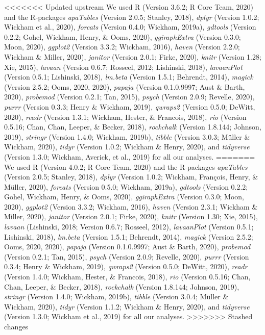 \documentclass[
  english,
  man,floatsintext]{apa6}
\begin{document}
<<<<<<< Updated upstream
We used R (Version 3.6.2; R Core Team, 2020) and the R-packages \emph{apaTables} (Version 2.0.5; Stanley, 2018), \emph{dplyr} (Version 1.0.2; Wickham et al., 2020), \emph{forcats} (Version 0.4.0; Wickham, 2019a), \emph{gdtools} (Version 0.2.2; Gohel, Wickham, Henry, \& Ooms, 2020), \emph{ggiraphExtra} (Version 0.3.0; Moon, 2020), \emph{ggplot2} (Version 3.3.2; Wickham, 2016), \emph{haven} (Version 2.2.0; Wickham \& Miller, 2020), \emph{janitor} (Version 2.0.1; Firke, 2020), \emph{knitr} (Version 1.28; Xie, 2015), \emph{lavaan} (Version 0.6.7; Rosseel, 2012; Lishinski, 2018), \emph{lavaanPlot} (Version 0.5.1; Lishinski, 2018), \emph{lm.beta} (Version 1.5.1; Behrendt, 2014), \emph{magick} (Version 2.5.2; Ooms, 2020, 2020), \emph{papaja} (Version 0.1.0.9997; Aust \& Barth, 2020), \emph{probemod} (Version 0.2.1; Tan, 2015), \emph{psych} (Version 2.0.9; Revelle, 2020), \emph{purrr} (Version 0.3.3; Henry \& Wickham, 2019), \emph{qwraps2} (Version 0.5.0; DeWitt, 2020), \emph{readr} (Version 1.3.1; Wickham, Hester, \& Francois, 2018), \emph{rio} (Version 0.5.16; Chan, Chan, Leeper, \& Becker, 2018), \emph{rockchalk} (Version 1.8.144; Johnson, 2019), \emph{stringr} (Version 1.4.0; Wickham, 2019b), \emph{tibble} (Version 3.0.3; Müller \& Wickham, 2020), \emph{tidyr} (Version 1.0.2; Wickham \& Henry, 2020), and \emph{tidyverse} (Version 1.3.0; Wickham, Averick, et al., 2019) for all our analyses.
=======
We used R (Version 4.0.2; R Core Team, 2020) and the R-packages \emph{apaTables} (Version 2.0.5; Stanley, 2018), \emph{dplyr} (Version 1.0.2; Wickham, François, Henry, \& Müller, 2020), \emph{forcats} (Version 0.5.0; Wickham, 2019a), \emph{gdtools} (Version 0.2.2; Gohel, Wickham, Henry, \& Ooms, 2020), \emph{ggiraphExtra} (Version 0.3.0; Moon, 2020), \emph{ggplot2} (Version 3.3.2; Wickham, 2016), \emph{haven} (Version 2.3.1; Wickham \& Miller, 2020), \emph{janitor} (Version 2.0.1; Firke, 2020), \emph{knitr} (Version 1.30; Xie, 2015), \emph{lavaan} (Lishinski, 2018; Version 0.6.7; Rosseel, 2012), \emph{lavaanPlot} (Version 0.5.1; Lishinski, 2018), \emph{lm.beta} (Version 1.5.1; Behrendt, 2014), \emph{magick} (Version 2.5.2; Ooms, 2020, 2020), \emph{papaja} (Version 0.1.0.9997; Aust \& Barth, 2020), \emph{probemod} (Version 0.2.1; Tan, 2015), \emph{psych} (Version 2.0.9; Revelle, 2020), \emph{purrr} (Version 0.3.4; Henry \& Wickham, 2019), \emph{qwraps2} (Version 0.5.0; DeWitt, 2020), \emph{readr} (Version 1.4.0; Wickham, Hester, \& Francois, 2018), \emph{rio} (Version 0.5.16; Chan, Chan, Leeper, \& Becker, 2018), \emph{rockchalk} (Version 1.8.144; Johnson, 2019), \emph{stringr} (Version 1.4.0; Wickham, 2019b), \emph{tibble} (Version 3.0.4; Müller \& Wickham, 2020), \emph{tidyr} (Version 1.1.2; Wickham \& Henry, 2020), and \emph{tidyverse} (Version 1.3.0; Wickham et al., 2019) for all our analyses.
>>>>>>> Stashed changes
\end{document}
